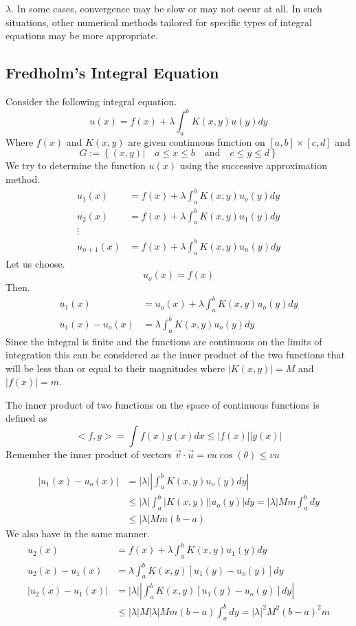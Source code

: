 $\lambda$. In some cases, convergence may be slow or may not occur at all. In such situations, other numerical methods tailored for specific types of integral equations may be more appropriate.


\subsection{Fredholm's Integral Equation}
Consider the following integral equation.
\[
u(x) = f(x) + \lambda\int_{a}^{b} K(x,y) u(y)dy    
\]
Where $f(x)$ and $K(x,y)$ are given continuous function on $[a,b]\times[c,d]$ and
\[
    G := \left\{ (x,y) | \quad a\leq x\leq b \quad \text{and} \quad c\leq y\leq d \right\}
\]
We try to determine the function $u(x)$ using the successive approximation method.
\begin{align*}
u_1(x) &= f(x) + \lambda\int_{a}^{b} K(x,y) u_o(y)dy
\\
u_2(x) &= f(x) + \lambda\int_{a}^{b} K(x,y) u_1(y)dy
\\
\vdots
\\
u_{n+1}(x) &= f(x) + \lambda\int_{a}^{b} K(x,y) u_n(y)dy
\end{align*}
Let us choose.
\[
u_o(x) = f(x)    
\]
Then.
\begin{align*}
u_1(x) &= u_o(x) + \lambda\int_{a}^{b} K(x,y) u_o(y)dy
\\
u_1(x)- u_o(x) &= \lambda\int_{a}^{b} K(x,y) u_o(y)dy
\end{align*}
Since the integral is finite and the functions are continuous on the limits of integration 
this can be considered as the inner product of the two functions 
that will be less than or equal to their magnitudes where $|K(x,y)| = M$ and $|f(x)| = m$.
\begin{enrichment*}{}
    The inner product of two functions on the space of continuous functions is defined as 
    \[
        <f,g> = \int f(x)g(x)dx \leq |f(x)||g(x)|
    \]
    Remember the inner product of vectors $\vec{v}\cdot \vec{u} = vu \cos(\theta) \leq vu$
\end{enrichment*}
\begin{align*}
    \left|u_1(x)- u_o(x)\right| &= |\lambda|\left|\int_{a}^{b} K(x,y) u_o(y)dy\right|    
    \\
    & \leq |\lambda|\int_{a}^{b}|K(x,y)||u_o(y)|dy = |\lambda|Mm\int_{a}^{b}dy
    \\
    & \leq |\lambda|Mm(b-a)
\end{align*}
We also have in the same manner. 
\begin{align*}
u_2(x) &= f(x) + \lambda\int_{a}^{b} K(x,y) u_1(y)dy
\\
u_2(x) - u_1(x)&= \lambda\int_{a}^{b} K(x,y) [u_1(y)-u_o(y)]dy
\\
|u_2(x) - u_1(x)| &= |\lambda|\left|\int_{a}^{b} K(x,y) [u_1(y)-u_o(y)]dy\right| 
\\
&\leq |\lambda|M |\lambda|Mm(b-a) \int_{a}^{b}dy = |\lambda|^2M^2{(b-a)}^2 m
\end{align*}
